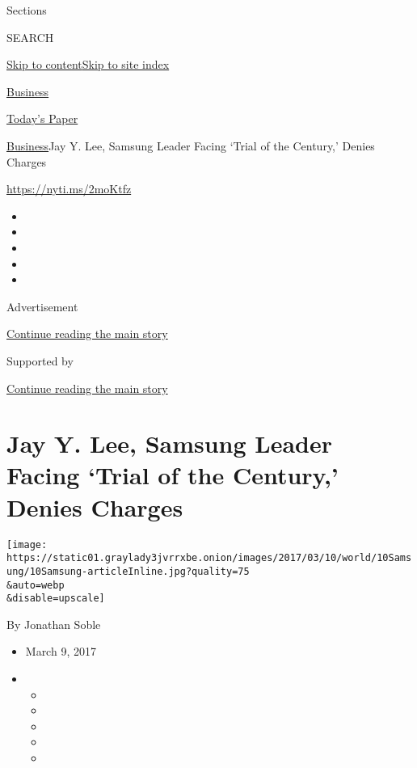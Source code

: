 Sections

SEARCH

\protect\hyperlink{site-content}{Skip to
content}\protect\hyperlink{site-index}{Skip to site index}

\href{https://www.nytimes3xbfgragh.onion/section/business}{Business}

\href{https://myaccount.nytimes3xbfgragh.onion/auth/login?response_type=cookie\&client_id=vi}{}

\href{https://www.nytimes3xbfgragh.onion/section/todayspaper}{Today's
Paper}

\href{/section/business}{Business}\textbar{}Jay Y. Lee, Samsung Leader
Facing `Trial of the Century,' Denies Charges

\url{https://nyti.ms/2moKtfz}

\begin{itemize}
\item
\item
\item
\item
\item
\end{itemize}

Advertisement

\protect\hyperlink{after-top}{Continue reading the main story}

Supported by

\protect\hyperlink{after-sponsor}{Continue reading the main story}

\hypertarget{jay-y-lee-samsung-leader-facing-trial-of-the-century-denies-charges}{%
\section{Jay Y. Lee, Samsung Leader Facing `Trial of the Century,'
Denies
Charges}\label{jay-y-lee-samsung-leader-facing-trial-of-the-century-denies-charges}}

\texttt{[image: https://static01.graylady3jvrrxbe.onion/images/2017/03/10/world/10Samsung/10Samsung-articleInline.jpg?quality=75\\\&auto=webp\\\&disable=upscale]}

By Jonathan Soble

\begin{itemize}
\item
  March 9, 2017
\item
  \begin{itemize}
  \item
  \item
  \item
  \item
  \item
  \end{itemize}
\end{itemize}

